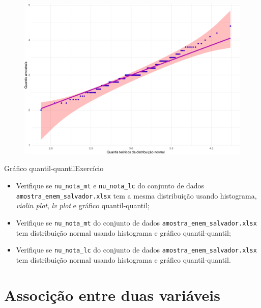 \documentclass[
  10pt,
  ignorenonframetext,
]{beamer}
\providecommand{\tightlist}{%
  \setlength{\itemsep}{0pt}\setlength{\parskip}{0pt}}\usepackage{longtable,booktabs,array}
\begin{document}
\begin{frame}
\begin{figure}

{\centering \includegraphics[width=1\textwidth,height=\textheight]{exploracao-visualizacao_files/figure-beamer/unnamed-chunk-124-1.pdf}

}

\end{figure}
\end{frame}

\begin{frame}[fragile]{Gráfico quantil-quantil\newline Exercício}
\protect\hypertarget{gruxe1fico-quantil-quantilexercuxedcio}{}
\begin{itemize}
\tightlist
\item
  Verifique se \texttt{nu\_nota\_mt} e \texttt{nu\_nota\_lc} do conjunto
  de dados \texttt{amostra\_enem\_salvador.xlsx} tem a mesma
  distribuição usando histograma, \emph{violin plot}, \emph{lv plot} e
  gráfico quantil-quantil;
\item
  Verifique se \texttt{nu\_nota\_mt} do conjunto de dados
  \texttt{amostra\_enem\_salvador.xlsx} tem distribuição normal usando
  histograma e gráfico quantil-quantil;
\item
  Verifique se \texttt{nu\_nota\_lc} do conjunto de dados
  \texttt{amostra\_enem\_salvador.xlsx} tem distribuição normal usando
  histograma e gráfico quantil-quantil.
\end{itemize}
\end{frame}

\hypertarget{associuxe7uxe3o-entre-duas-variuxe1veis}{%
\section{Associção entre duas
variáveis}\label{associuxe7uxe3o-entre-duas-variuxe1veis}}
\end{document}
